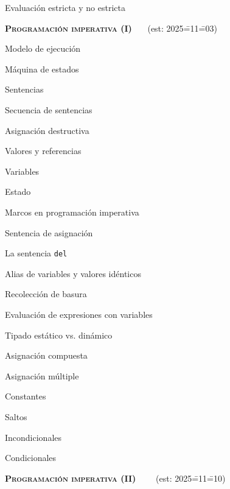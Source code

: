 \begin{longenum}
\begin{longenum}
\begin{longenum}
            \item Evaluación estricta y no estricta
        \end{longenum}
    \end{longenum}
    \item \textbf{\textsc{Programación imperativa (I)}} \ \ \ (est: 2025\==11\==03)
    \begin{longenum}
        \item Modelo de ejecución
        \begin{longenum}
            \item Máquina de estados
            \item Sentencias
            \item Secuencia de sentencias
        \end{longenum}
        \item Asignación destructiva
        \begin{longenum}
            \item Valores y referencias
            \item Variables
            \item Estado
            \item Marcos en programación imperativa
            \item Sentencia de asignación
            \item La sentencia \texttt{del}
            \item Alias de variables y valores idénticos
            \item Recolección de basura
            \item Evaluación de expresiones con variables
            \item Tipado estático vs. dinámico
            \item Asignación compuesta
            \item Asignación múltiple
            \item Constantes
        \end{longenum}
        \item Saltos
        \begin{longenum}
            \item Incondicionales
            \item Condicionales
        \end{longenum}
    \end{longenum}
    \item \textbf{\textsc{Programación imperativa (II)}} \ \ \ \ (est: 2025\==11\==10)

\end{longenum}
